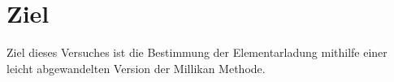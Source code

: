 \section{Ziel}
Ziel dieses Versuches ist die Bestimmung der 
Elementarladung mithilfe einer leicht abgewandelten 
Version der Millikan Methode.
\label{sec:Ziel}



